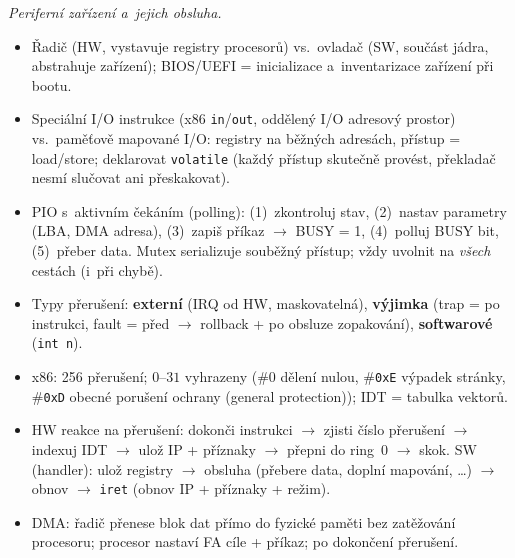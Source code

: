 \documentclass[11pt,a4paper]{article}
\newcommand{\cd}{\lstinline[style=kod]}
\begin{document}
\begin{poznamka}
\smallskip
\emph{Periferní zařízení a~jejich obsluha.}
\begin{itemize}
  \item Řadič (HW, vystavuje registry procesorů) vs.\ ovladač (SW, součást jádra, abstrahuje zařízení); BIOS/UEFI = inicializace a~inventarizace zařízení při bootu.
  \item Speciální I/O instrukce (x86 \texttt{in}/\texttt{out}, oddělený I/O adresový prostor) vs.\ paměťově mapované I/O: registry na běžných adresách, přístup = load/store; deklarovat \cd!volatile! (každý přístup skutečně provést, překladač nesmí slučovat ani přeskakovat).
  \item PIO s~aktivním čekáním (polling): (1)~zkontroluj stav, (2)~nastav parametry (LBA, DMA adresa), (3)~zapiš příkaz $\to$ BUSY = 1, (4)~polluj BUSY bit, (5)~přeber data. Mutex serializuje souběžný přístup; vždy uvolnit na \emph{všech} cestách (i~při chybě).
  \item Typy přerušení: \textbf{externí} (IRQ od HW, maskovatelná), \textbf{výjimka} (trap = po instrukci, fault = před $\to$ rollback + po obsluze zopakování), \textbf{softwarové} (\texttt{int n}).
  \item x86: 256 přerušení; $0$--$31$ vyhrazeny (\#0 dělení nulou, \#\texttt{0xE} výpadek stránky, \#\texttt{0xD} obecné porušení ochrany (general protection)); IDT = tabulka vektorů.
  \item HW reakce na přerušení: dokonči instrukci $\to$ zjisti číslo přerušení $\to$ indexuj IDT $\to$ ulož IP + příznaky $\to$ přepni do ring~0 $\to$ skok. SW (handler): ulož registry $\to$ obsluha (přebere data, doplní mapování, \dots) $\to$ obnov $\to$ \texttt{iret} (obnov IP + příznaky + režim).
  \item DMA: řadič přenese blok dat přímo do fyzické paměti bez zatěžování procesoru; procesor nastaví FA cíle + příkaz; po dokončení přerušení.
\end{itemize}


\end{poznamka}
\end{document}
